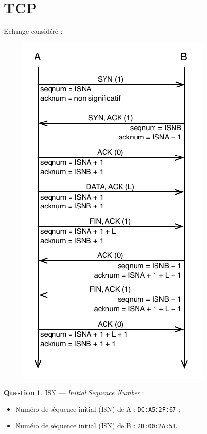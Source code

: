 \documentclass[11pt,english,french]{scrreprt}
\theoremstyle{remark}
\theoremstyle{definition}
\newtheorem{ques}{Question}[section]
\begin{document}
\clearpage

\section{TCP} %

Echange considéré :
\begin{figure}[h!]
	\center
	\includegraphics[scale=1]{Exam2009/echange-TCP}
\end{figure}

\begin{ques}
	ISN --- \emph{Initial Sequence Number} :\begin{itemize}
		\item Numéro de séquence initial (ISN) de A : \lstinline!DC:A5:2F:67! ;
		\item Numéro de séquence initial (ISN) de B : \lstinline!2D:00:2A:58!.
	\end{itemize}
\end{ques}
\end{document}
